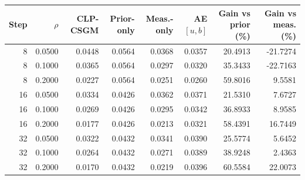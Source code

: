 \begin{tabular}{rrrrrrrr}
\toprule
Step & $\rho$ & CLP-CSGM & Prior-only & Meas.-only & AE $[u,b]$ & Gain vs prior (\%) & Gain vs meas. (\%) \\
\midrule
8 & 0.0500 & 0.0448 & 0.0564 & 0.0368 & 0.0357 & 20.4913 & -21.7274 \\
8 & 0.1000 & 0.0365 & 0.0564 & 0.0297 & 0.0320 & 35.3433 & -22.7163 \\
8 & 0.2000 & 0.0227 & 0.0564 & 0.0251 & 0.0260 & 59.8016 & 9.5581 \\
16 & 0.0500 & 0.0334 & 0.0426 & 0.0362 & 0.0371 & 21.5310 & 7.6727 \\
16 & 0.1000 & 0.0269 & 0.0426 & 0.0295 & 0.0342 & 36.8933 & 8.9585 \\
16 & 0.2000 & 0.0177 & 0.0426 & 0.0213 & 0.0321 & 58.4391 & 16.7449 \\
32 & 0.0500 & 0.0322 & 0.0432 & 0.0341 & 0.0390 & 25.5774 & 5.6452 \\
32 & 0.1000 & 0.0264 & 0.0432 & 0.0271 & 0.0389 & 38.9248 & 2.4363 \\
32 & 0.2000 & 0.0170 & 0.0432 & 0.0219 & 0.0396 & 60.5584 & 22.0073 \\
\bottomrule
\end{tabular}
